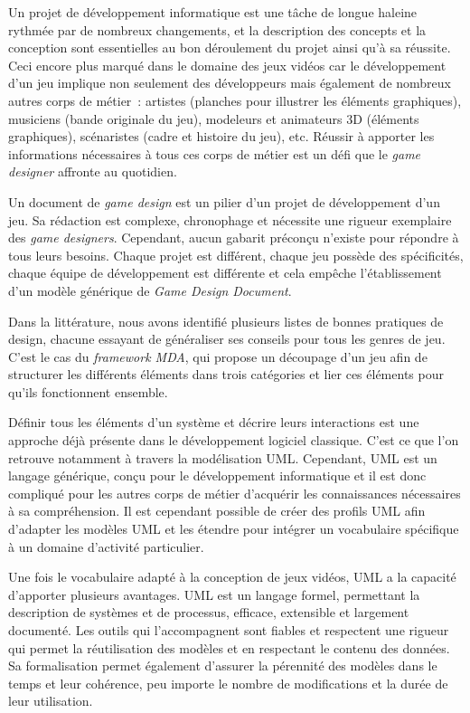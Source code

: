 \begin{conclusion}

Un projet de développement informatique est une tâche de longue haleine rythmée par de nombreux changements,
et
la description des concepts et la conception sont essentielles au bon déroulement du projet ainsi qu'à sa réussite.
%
Ceci encore plus marqué dans le domaine des jeux vidéos car
le développement d'un jeu implique non seulement des développeurs mais également de nombreux autres corps de métier~: artistes (planches pour illustrer les éléments graphiques),  musiciens (bande originale du jeu), modeleurs et animateurs 3D (éléments graphiques), scénaristes (cadre et histoire du jeu), etc.
Réussir à apporter les informations nécessaires à tous ces corps de métier est un défi que le \emph{game designer} affronte au quotidien.

Un document de \emph{game design} est un pilier d'un projet de développement d'un jeu.
Sa rédaction est complexe, chronophage et nécessite une rigueur exemplaire des \emph{game designers}.
Cependant, aucun gabarit préconçu n'existe pour répondre à tous leurs besoins.
Chaque projet est différent, chaque jeu possède des spécificités, chaque équipe de développement est différente et cela empêche l'établissement d'un modèle générique de \emph{Game Design Document}.

Dans la littérature, nous avons identifié plusieurs listes de bonnes pratiques de design, chacune essayant de généraliser ses conseils pour tous les genres de jeu.
C'est le cas du \emph{framework MDA}, qui propose un découpage d'un jeu afin de structurer les différents éléments dans trois catégories et lier ces éléments pour qu'ils fonctionnent ensemble.

Définir tous les éléments d'un système et décrire leurs interactions est une approche déjà présente dans le développement logiciel classique.
C'est ce que l'on retrouve notamment à travers la modélisation UML.
Cependant, UML est un langage générique, conçu pour le développement informatique et il est donc compliqué pour les autres corps de métier d'acquérir les connaissances nécessaires à sa compréhension.
Il est cependant possible de créer des profils UML afin d'adapter les modèles UML et les étendre pour intégrer un vocabulaire spécifique à un domaine d'activité particulier.

Une fois le vocabulaire adapté à la conception de jeux vidéos, UML a la capacité d'apporter plusieurs avantages.
UML est un langage formel, permettant la description de systèmes et de processus, efficace, extensible et largement documenté.
Les outils qui l'accompagnent sont fiables et respectent une rigueur qui permet la réutilisation des modèles et en respectant le contenu des données.
Sa formalisation permet également d'assurer la pérennité des modèles dans le temps et leur cohérence, peu importe le nombre de modifications et la durée de leur utilisation.


\end{conclusion}
